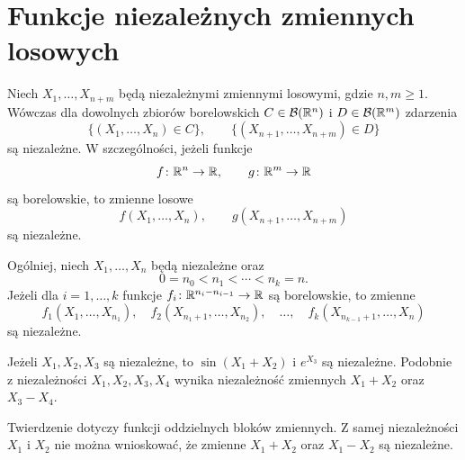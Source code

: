 
\section{Funkcje niezależnych zmiennych losowych}
\label{sec:funkcje-niezaleznych-zmiennych}

\begin{twierdzenie}
\label{tw:funkcje-niezaleznych-blokow}
Niech $X_1,\ldots,X_{n+m}$ będą niezależnymi zmiennymi losowymi,
gdzie $n,m\geq1$. Wówczas dla dowolnych zbiorów borelowskich
$C\in\mathcal{B}(\mathbb{R}^n)$ i $D\in\mathcal{B}(\mathbb{R}^m)$ zdarzenia
\[
  \{(X_1,\ldots,X_n)\in C\},
  \qquad
  \{(X_{n+1},\ldots,X_{n+m})\in D\}
\]
są niezależne. W szczególności, jeżeli funkcje
\[
  f\colon\mathbb{R}^n\to\mathbb{R},
  \qquad g\colon\mathbb{R}^m\to\mathbb{R}
\]
są borelowskie, to zmienne losowe
\[
  f(X_1,\ldots,X_n),
  \qquad g(X_{n+1},\ldots,X_{n+m})
\]
są niezależne.
\end{twierdzenie}

\begin{uwaga}
\label{uwaga:wiecej-niezaleznych-blokow}
Ogólniej, niech $X_1,\ldots,X_n$ będą niezależne oraz
\[
  0=n_0<n_1<\cdots<n_k=n.
\]
Jeżeli dla $i=1,\ldots,k$ funkcje
$f_i\colon\mathbb{R}^{n_i-n_{i-1}}\to\mathbb{R}$ są borelowskie, to zmienne
\[
  f_1(X_1,\ldots,X_{n_1}),\quad
  f_2(X_{n_1+1},\ldots,X_{n_2}),\quad\ldots,\quad
  f_k(X_{n_{k-1}+1},\ldots,X_n)
\]
są niezależne.
\end{uwaga}

\begin{przyklad}
Jeżeli $X_1,X_2,X_3$ są niezależne, to
$\sin(X_1+X_2)$ i $e^{X_3}$ są niezależne.
Podobnie z niezależności $X_1,X_2,X_3,X_4$ wynika niezależność
zmiennych $X_1+X_2$ oraz $X_3-X_4$.
\end{przyklad}

\begin{uwaga}
Twierdzenie dotyczy funkcji oddzielnych bloków zmiennych.
Z samej niezależności $X_1$ i $X_2$ nie można wnioskować,
że zmienne $X_1+X_2$ oraz $X_1-X_2$ są niezależne.
\end{uwaga}

